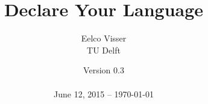 \newcommand{\Version}{0.3}

\title{Declare Your Language}
	
\author{Eelco Visser\\[20pt]TU Delft\\[20pt]}
	
\date{Version \Version \\\ \\June 12, 2015 -- \today}
	



%




%
%
%



	

